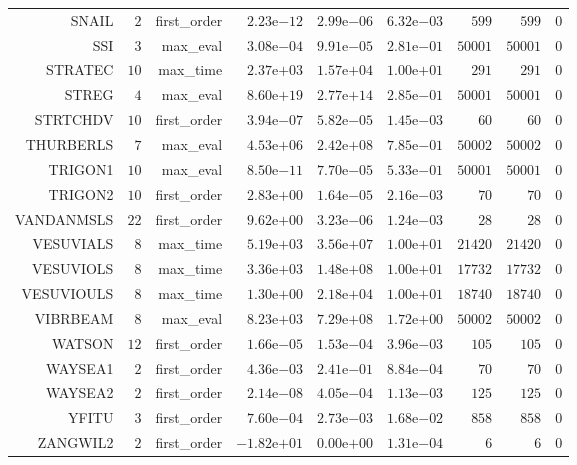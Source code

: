 \begin{longtable}{rrrrrrrrr}
SNAIL & \(     2\) & first\_order & \( 2.23\)e\(-12\) & \( 2.99\)e\(-06\) & \( 6.32\)e\(-03\) & \(   599\) & \(   599\) & \(     0\) \\
SSI & \(     3\) & max\_eval & \( 3.08\)e\(-04\) & \( 9.91\)e\(-05\) & \( 2.81\)e\(-01\) & \( 50001\) & \( 50001\) & \(     0\) \\
STRATEC & \(    10\) & max\_time & \( 2.37\)e\(+03\) & \( 1.57\)e\(+04\) & \( 1.00\)e\(+01\) & \(   291\) & \(   291\) & \(     0\) \\
STREG & \(     4\) & max\_eval & \( 8.60\)e\(+19\) & \( 2.77\)e\(+14\) & \( 2.85\)e\(-01\) & \( 50001\) & \( 50001\) & \(     0\) \\
STRTCHDV & \(    10\) & first\_order & \( 3.94\)e\(-07\) & \( 5.82\)e\(-05\) & \( 1.45\)e\(-03\) & \(    60\) & \(    60\) & \(     0\) \\
THURBERLS & \(     7\) & max\_eval & \( 4.53\)e\(+06\) & \( 2.42\)e\(+08\) & \( 7.85\)e\(-01\) & \( 50002\) & \( 50002\) & \(     0\) \\
TRIGON1 & \(    10\) & max\_eval & \( 8.50\)e\(-11\) & \( 7.70\)e\(-05\) & \( 5.33\)e\(-01\) & \( 50001\) & \( 50001\) & \(     0\) \\
TRIGON2 & \(    10\) & first\_order & \( 2.83\)e\(+00\) & \( 1.64\)e\(-05\) & \( 2.16\)e\(-03\) & \(    70\) & \(    70\) & \(     0\) \\
VANDANMSLS & \(    22\) & first\_order & \( 9.62\)e\(+00\) & \( 3.23\)e\(-06\) & \( 1.24\)e\(-03\) & \(    28\) & \(    28\) & \(     0\) \\
VESUVIALS & \(     8\) & max\_time & \( 5.19\)e\(+03\) & \( 3.56\)e\(+07\) & \( 1.00\)e\(+01\) & \( 21420\) & \( 21420\) & \(     0\) \\
VESUVIOLS & \(     8\) & max\_time & \( 3.36\)e\(+03\) & \( 1.48\)e\(+08\) & \( 1.00\)e\(+01\) & \( 17732\) & \( 17732\) & \(     0\) \\
VESUVIOULS & \(     8\) & max\_time & \( 1.30\)e\(+00\) & \( 2.18\)e\(+04\) & \( 1.00\)e\(+01\) & \( 18740\) & \( 18740\) & \(     0\) \\
VIBRBEAM & \(     8\) & max\_eval & \( 8.23\)e\(+03\) & \( 7.29\)e\(+08\) & \( 1.72\)e\(+00\) & \( 50002\) & \( 50002\) & \(     0\) \\
WATSON & \(    12\) & first\_order & \( 1.66\)e\(-05\) & \( 1.53\)e\(-04\) & \( 3.96\)e\(-03\) & \(   105\) & \(   105\) & \(     0\) \\
WAYSEA1 & \(     2\) & first\_order & \( 4.36\)e\(-03\) & \( 2.41\)e\(-01\) & \( 8.84\)e\(-04\) & \(    70\) & \(    70\) & \(     0\) \\
WAYSEA2 & \(     2\) & first\_order & \( 2.14\)e\(-08\) & \( 4.05\)e\(-04\) & \( 1.13\)e\(-03\) & \(   125\) & \(   125\) & \(     0\) \\
YFITU & \(     3\) & first\_order & \( 7.60\)e\(-04\) & \( 2.73\)e\(-03\) & \( 1.68\)e\(-02\) & \(   858\) & \(   858\) & \(     0\) \\
ZANGWIL2 & \(     2\) & first\_order & \(-1.82\)e\(+01\) & \( 0.00\)e\(+00\) & \( 1.31\)e\(-04\) & \(     6\) & \(     6\) & \(     0\) \\\hline
\end{longtable}
